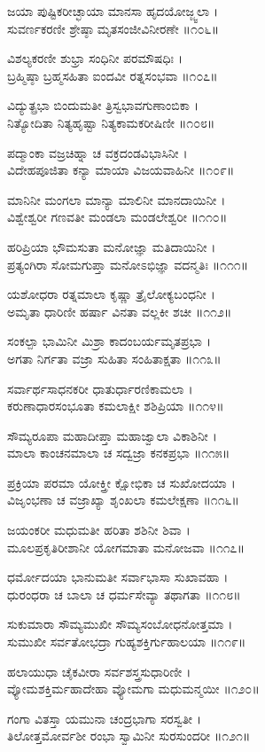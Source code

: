 ಜಯಾ ಪುಷ್ಟಿಕರೀಚ್ಛಾಯಾ ಮಾನಸಾ ಹೃದಯೋಜ್ಜ್ವಲಾ ।\\
ಸುವರ್ಣಕರಣೀ ಶ್ರೇಷ್ಠಾ ಮೃತಸಂಜೀವಿನೀರಣೇ ॥೧೦೬॥

ವಿಶಲ್ಯಕರಣೀ ಶುಭ್ರಾ ಸಂಧಿನೀ ಪರಮೌಷಧಿಃ ।\\
ಬ್ರಹ್ಮಿಷ್ಠಾ ಬ್ರಹ್ಮಸಹಿತಾ ಐಂದವೀ ರತ್ನಸಂಭವಾ ॥೧೦೭॥

ವಿದ್ಯುತ್ಪ್ರಭಾ ಬಿಂದುಮತೀ ತ್ರಿಸ್ವಭಾವಗುಣಾಂಬಿಕಾ ।\\
ನಿತ್ಯೋದಿತಾ ನಿತ್ಯಹೃಷ್ಟಾ ನಿತ್ಯಕಾಮಕರೀಷಿಣೀ ॥೧೦೮॥

ಪದ್ಮಾಂಕಾ ವಜ್ರಚಿಹ್ನಾ ಚ ವಕ್ರದಂಡವಿಭಾಸಿನೀ ।\\
ವಿದೇಹಪೂಜಿತಾ ಕನ್ಯಾ ಮಾಯಾ ವಿಜಯವಾಹಿನೀ ॥೧೦೯॥

ಮಾನಿನೀ ಮಂಗಲಾ ಮಾನ್ಯಾ ಮಾಲಿನೀ ಮಾನದಾಯಿನೀ ।\\
ವಿಶ್ವೇಶ್ವರೀ ಗಣವತೀ ಮಂಡಲಾ ಮಂಡಲೇಶ್ವರೀ ॥೧೧೦॥

ಹರಿಪ್ರಿಯಾ ಭೌಮಸುತಾ ಮನೋಜ್ಞಾ ಮತಿದಾಯಿನೀ ।\\
ಪ್ರತ್ಯಂಗಿರಾ ಸೋಮಗುಪ್ತಾ ಮನೋಽಭಿಜ್ಞಾ ವದನ್ಮತಿಃ ॥೧೧೧॥

ಯಶೋಧರಾ ರತ್ನಮಾಲಾ ಕೃಷ್ಣಾ ತ್ರೈಲೋಕ್ಯಬಂಧನೀ ।\\
ಅಮೃತಾ ಧಾರಿಣೀ ಹರ್ಷಾ ವಿನತಾ ವಲ್ಲಕೀ ಶಚೀ ॥೧೧೨॥

ಸಂಕಲ್ಪಾ ಭಾಮಿನೀ ಮಿಶ್ರಾ ಕಾದಂಬರ್ಯಮೃತಪ್ರಭಾ ।\\
ಅಗತಾ ನಿರ್ಗತಾ ವಜ್ರಾ ಸುಹಿತಾ ಸಂಹಿತಾಕ್ಷತಾ ॥೧೧೩॥

ಸರ್ವಾರ್ಥಸಾಧನಕರೀ ಧಾತುರ್ಧಾರಣಿಕಾಮಲಾ ।\\
ಕರುಣಾಧಾರಸಂಭೂತಾ ಕಮಲಾಕ್ಷೀ ಶಶಿಪ್ರಿಯಾ ॥೧೧೪॥

ಸೌಮ್ಯರೂಪಾ ಮಹಾದೀಪ್ತಾ ಮಹಾಜ್ವಾಲಾ ವಿಕಾಶಿನೀ ।\\
ಮಾಲಾ ಕಾಂಚನಮಾಲಾ ಚ ಸದ್ವಜ್ರಾ ಕನಕಪ್ರಭಾ ॥೧೧೫॥

ಪ್ರಕ್ರಿಯಾ ಪರಮಾ ಯೋಕ್ತ್ರೀ ಕ್ಷೋಭಿಕಾ ಚ ಸುಖೋದಯಾ ।\\
ವಿಜೃಂಭಣಾ ಚ ವಜ್ರಾಖ್ಯಾ ಶೃಂಖಲಾ ಕಮಲೇಕ್ಷಣಾ ॥೧೧೬॥

ಜಯಂಕರೀ ಮಧುಮತೀ ಹರಿತಾ ಶಶಿನೀ ಶಿವಾ ।\\
ಮೂಲಪ್ರಕೃತಿರೀಶಾನೀ ಯೋಗಮಾತಾ ಮನೋಜವಾ ॥೧೧೭॥

ಧರ್ಮೋದಯಾ ಭಾನುಮತೀ ಸರ್ವಾಭಾಸಾ ಸುಖಾವಹಾ ।\\
ಧುರಂಧರಾ ಚ ಬಾಲಾ ಚ ಧರ್ಮಸೇವ್ಯಾ ತಥಾಗತಾ ॥೧೧೮॥

ಸುಕುಮಾರಾ ಸೌಮ್ಯಮುಖೀ ಸೌಮ್ಯಸಂಬೋಧನೋತ್ತಮಾ ।\\
ಸುಮುಖೀ ಸರ್ವತೋಭದ್ರಾ ಗುಹ್ಯಶಕ್ತಿರ್ಗುಹಾಲಯಾ ॥೧೧೯॥

ಹಲಾಯುಧಾ ಚೈಕವೀರಾ ಸರ್ವಶಸ್ತ್ರಸುಧಾರಿಣೀ ।\\
ವ್ಯೋಮಶಕ್ತಿರ್ಮಹಾದೇಹಾ ವ್ಯೋಮಗಾ ಮಧುಮನ್ಮಯೀ ॥೧೨೦॥

ಗಂಗಾ ವಿತಸ್ತಾ ಯಮುನಾ ಚಂದ್ರಭಾಗಾ ಸರಸ್ವತೀ ।\\
ತಿಲೋತ್ತಮೋರ್ವಶೀ ರಂಭಾ ಸ್ವಾಮಿನೀ ಸುರಸುಂದರೀ ॥೧೨೧॥

